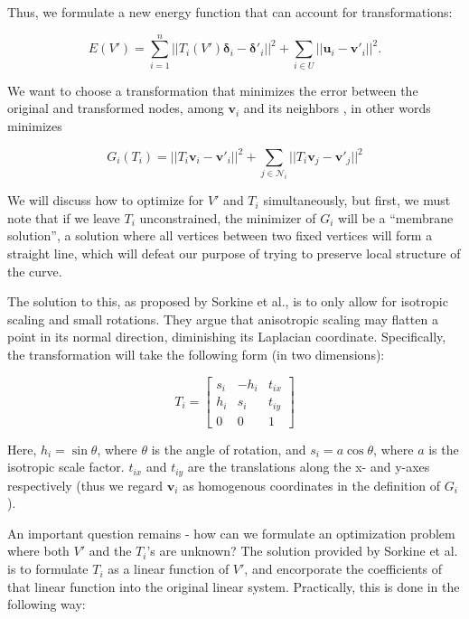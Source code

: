 \documentclass[english]{article}
\begin{document}
Thus, we formulate a new energy function that can account for transformations:

\begin{equation}
  E(V') = \sum_{i = 1}^n || T_i(V') \mathbf{\delta}_i - \mathbf{\delta'}_i||^2 + \sum_{i \in U} || \mathbf{u}_i - \mathbf{v'}_i||^2.
  \label{eq1}
\end{equation}

We want to choose a transformation that minimizes the error between the original and transformed nodes, among $\mathbf{v}_i$ and its neighbors , in other words minimizes

\[
G_i(T_i) = || T_i\mathbf{v}_i - \mathbf{v'}_i ||^2 + \sum_{j \in \mathcal{N}_i}||T_i \mathbf{v}_j - \mathbf{v'}_j||^2
\]

We will discuss how to optimize for $V'$ and $T_i$ simultaneously, but first, we must note that if we leave $T_i$ unconstrained, the minimizer of $G_i$ will be a ``membrane solution'', a solution where all vertices between two fixed vertices will form a straight line, which will defeat our purpose of trying to preserve local structure of the curve.

The solution to this, as proposed by Sorkine et al., is to only allow for isotropic scaling and small rotations. They argue that anisotropic scaling may flatten a point in its normal direction, diminishing its Laplacian coordinate. Specifically, the transformation will take the following form (in two dimensions):

\[
T_i = \left[
  \begin{matrix}
    s_i & -h_i & t_{ix}\\
    h_i & s_i & t_{iy} \\
    0   & 0   & 1
  \end{matrix}
  \right]
\]

Here, $h_i = \sin \theta$, where $\theta$ is the angle of rotation, and $s_i = a \cos \theta$, where $a$ is the isotropic scale factor. $t_{ix}$ and $t_{iy}$ are the translations along the x- and y-axes respectively (thus we regard $\mathbf{v}_i$ as homogenous coordinates in the definition of $G_i$).

An important question remains - how can we formulate an optimization problem where both $V'$ and the $T_i$'s are unknown? The solution provided by Sorkine et al. is to formulate $T_i$ as a linear function of $V'$, and encorporate the coefficients of that linear function into the original linear system. Practically, this is done in the following way:
\end{document}

